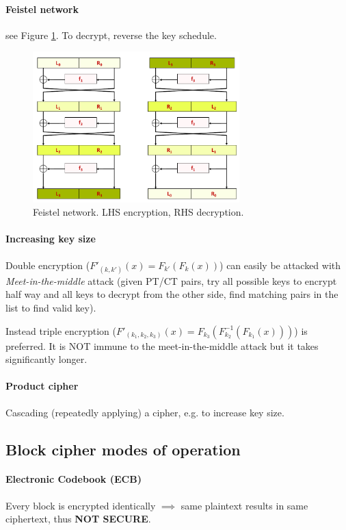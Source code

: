 \paragraph{Feistel network}
see Figure \ref{fig:feistel-network}. To decrypt, reverse the key schedule.
\begin{figure}[h]
    \centering
    \includegraphics[width=8cm]{images/ch2-feistel-network.png}
    \caption{Feistel network. LHS encryption, RHS decryption.}
    \label{fig:feistel-network}
\end{figure}

\paragraph{Increasing key size} Double encryption ($F'_{(k, k')}(x) = F_{k'}(F_{k}(x))$) can easily be attacked with \textit{Meet-in-the-middle} attack (given PT/CT pairs, try all possible keys to encrypt half way and all keys to decrypt from the other side, find matching pairs in the list to find valid key).

Instead triple encryption ($F'_{(k_1, k_2, k_3)}(x) = F_{k_3}(F^{-1}_{k_2}(F_{k_1}(x)))$) is preferred. It is NOT immune to the meet-in-the-middle attack but it takes significantly longer. 

\paragraph{Product cipher} Cascading (repeatedly applying) a cipher, e.g. to increase key size.


\subsection{Block cipher modes of operation}

\paragraph{Electronic Codebook (ECB)} Every block is encrypted identically $\implies$ same plaintext results in same ciphertext, thus \textbf{NOT SECURE}.


